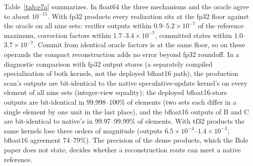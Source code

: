 \documentclass[conference]{IEEEtran}
\begin{document}
Table~\ref{tab:e7a} summarizes. In float64 the three mechanisms and the oracle agree to about $10^{-15}$. With fp32 products every realization sits at the fp32 floor against the oracle on all nine sets: verifier outputs within $0.9$--$5.2\times10^{-7}$ of the reference maximum, correction factors within $1.7$--$3.4\times10^{-7}$, committed states within $1.0$--$3.7\times10^{-7}$. Commit from identical oracle factors is at the same floor, so on these operands the compact reconstruction adds no error beyond fp32 roundoff. In a diagnostic comparison with fp32 output stores (a separately compiled specialization of both kernels, not the deployed bfloat16 path), the production scan's outputs are bit-identical to the native speculative-update kernel's on every element of all nine sets (integer-view equality); the deployed bfloat16-store outputs are bit-identical in 99.998--100\% of elements (two sets each differ in a single element by one unit in the last place), and the bfloat16 outputs of B and C are bit-identical to native's in 99.97--99.99\% of elements. With tf32 products the same kernels lose three orders of magnitude (outputs $6.5\times10^{-4}$--$1.4\times10^{-3}$; bfloat16 agreement 74--79\%). The precision of the dense products, which the Bole paper does not state, decides whether a reconstruction route can meet a native reference.
\end{document}
